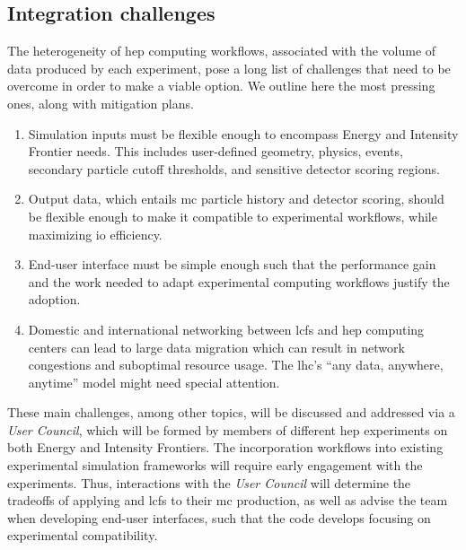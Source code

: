 \subsection{Integration challenges}

The heterogeneity of \ac{hep} computing workflows, associated with the volume of
data produced by each experiment, pose a long list of challenges that need to be
overcome in order to make \celeritas a viable option. We outline here the most
pressing ones, along with mitigation plans. 
\begin{enumerate}[itemsep=0pt]
  \item Simulation inputs must be flexible enough to encompass Energy and
    Intensity Frontier needs. This includes user-defined geometry, physics,
    events, secondary particle cutoff thresholds, and sensitive detector scoring
    regions.
  \item Output data, which entails \ac{mc} particle history and detector
    scoring, should be flexible enough to make it compatible to experimental
    workflows, while maximizing \ac{io} efficiency.
  \item End-user interface must be simple enough such that the performance gain
    and the work needed to adapt experimental computing workflows justify the
    adoption.
  \item Domestic and international networking between \acp{lcf} and \ac{hep}
    computing centers can lead to large data migration which can result in
    network congestions and suboptimal resource usage.  The \ac{lhc}'s ``any
    data, anywhere, anytime'' model \cite{hep-network-requirements} might need
    special attention.
\end{enumerate}

These main challenges, among other topics, will be discussed and addressed via a
\celeritas \emph{User Council}, which will be formed by members of different
\ac{hep} experiments on both Energy and Intensity Frontiers. The incorporation
\celeritas workflows into existing experimental simulation frameworks will
require early engagement with the experiments. Thus, interactions with the
\emph{User Council} will determine the tradeoffs of applying \celeritas and
\acp{lcf} to their \ac{mc} production, as well as advise the \celeritas team
when developing end-user interfaces, such that the code develops focusing on
experimental compatibility.

